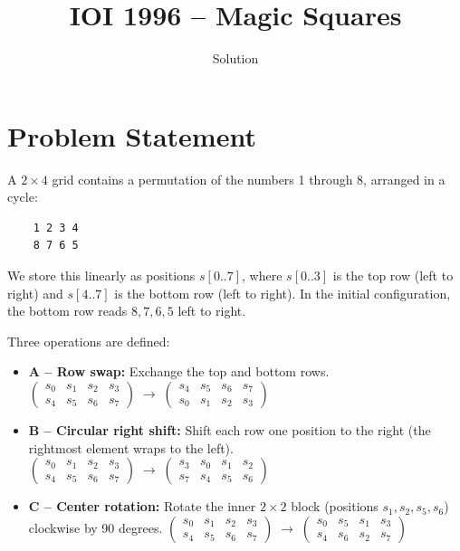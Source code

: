 \documentclass[11pt,a4paper]{article}
\title{IOI 1996 -- Magic Squares}
\author{Solution}
\date{}
\begin{document}
\maketitle

\section{Problem Statement}

A $2 \times 4$ grid contains a permutation of the numbers 1 through 8, arranged
in a cycle:
\begin{verbatim}
    1 2 3 4
    8 7 6 5
\end{verbatim}
We store this linearly as positions $s[0..7]$, where $s[0..3]$ is the top row
(left to right) and $s[4..7]$ is the bottom row (left to right). In the initial
configuration, the bottom row reads $8, 7, 6, 5$ left to right.

Three operations are defined:
\begin{itemize}
  \item \textbf{A -- Row swap:} Exchange the top and bottom rows.
    {\small
    $\begin{pmatrix}s_0 & s_1 & s_2 & s_3 \\ s_4 & s_5 & s_6 & s_7\end{pmatrix}
     \;\to\;
     \begin{pmatrix}s_4 & s_5 & s_6 & s_7 \\ s_0 & s_1 & s_2 & s_3\end{pmatrix}$}

  \item \textbf{B -- Circular right shift:} Shift each row one position to the right
    (the rightmost element wraps to the left).
    {\small
    $\begin{pmatrix}s_0 & s_1 & s_2 & s_3 \\ s_4 & s_5 & s_6 & s_7\end{pmatrix}
     \;\to\;
     \begin{pmatrix}s_3 & s_0 & s_1 & s_2 \\ s_7 & s_4 & s_5 & s_6\end{pmatrix}$}

  \item \textbf{C -- Center rotation:} Rotate the inner $2 \times 2$ block
    (positions $s_1, s_2, s_5, s_6$) clockwise by 90 degrees.
    {\small
    $\begin{pmatrix}s_0 & s_1 & s_2 & s_3 \\ s_4 & s_5 & s_6 & s_7\end{pmatrix}
     \;\to\;
     \begin{pmatrix}s_0 & s_5 & s_1 & s_3 \\ s_4 & s_6 & s_2 & s_7\end{pmatrix}$}
\end{itemize}
\end{document}
